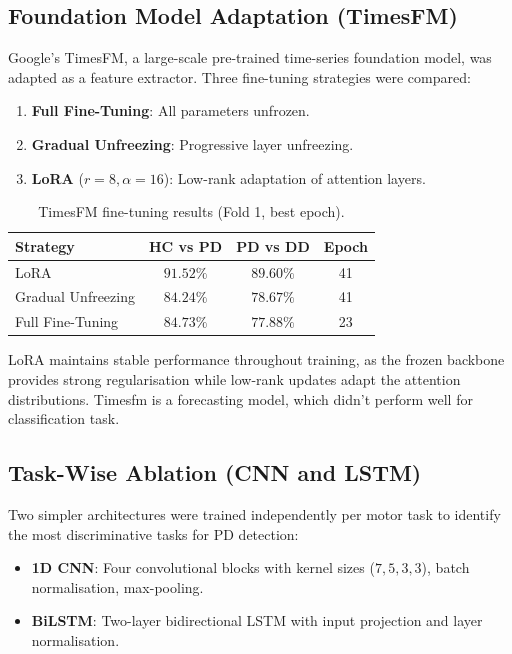 \documentclass[conference]{IEEEtran}
\begin{document}
\subsection{Foundation Model Adaptation (TimesFM)}

Google's TimesFM, a large-scale pre-trained time-series foundation model, was adapted as a feature extractor. Three fine-tuning strategies were compared:

\begin{enumerate}[noitemsep]
  \item \textbf{Full Fine-Tuning}: All parameters unfrozen.
  \item \textbf{Gradual Unfreezing}: Progressive layer unfreezing.
  \item \textbf{LoRA} ($r{=}8, \alpha{=}16$): Low-rank adaptation of attention layers.
\end{enumerate}

\begin{table}[H]
\centering
\caption{TimesFM fine-tuning results (Fold 1, best epoch).}
\label{tab:timesfm}
\begin{tabular}{lccc}
\toprule
\textbf{Strategy} & \textbf{HC vs PD} & \textbf{PD vs DD} & \textbf{Epoch} \\
\midrule
LoRA                   & $\mathbf{91.52\%}$ & $\mathbf{89.60\%}$ & 41 \\
Gradual Unfreezing     & $84.24\%$          & $78.67\%$          & 41 \\
Full Fine-Tuning       & $84.73\%$          & $77.88\%$          & 23 \\
\bottomrule
\end{tabular}
\end{table}

LoRA maintains stable performance throughout training, as the frozen backbone provides strong regularisation while low-rank updates adapt the attention distributions. Timesfm is a forecasting model, which didn't perform well for classification task.


\subsection{Task-Wise Ablation (CNN and LSTM)}

Two simpler architectures were trained independently per motor task to identify the most discriminative tasks for PD detection:
\begin{itemize}[noitemsep]
  \item \textbf{1D CNN}: Four convolutional blocks with kernel sizes ($7, 5, 3, 3$), batch normalisation, max-pooling.
  \item \textbf{BiLSTM}: Two-layer bidirectional LSTM with input projection and layer normalisation.
\end{itemize}
\end{document}
